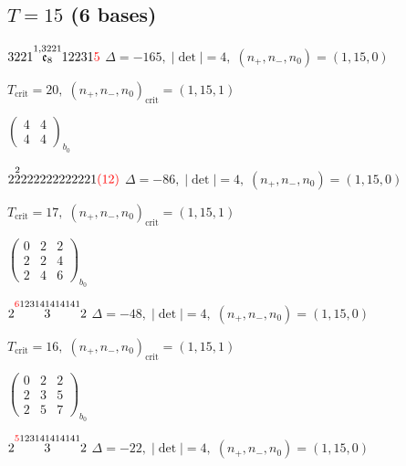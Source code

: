 \documentclass[10pt]{article}
\begin{document}
\subsection*{$T = 15$ \quad (6 bases)}
\smallskip

$3221\overset{1,3221}{\mathfrak{e}_8}12231\textcolor{red}{5}$ \quad $\Delta=-165,\; |\det|=4,\; (n_+,n_-,n_0)=(1,15,0)$

\hspace{1em}$T_{\text{crit}}=20,\; (n_+,n_-,n_0)_{\text{crit}}=(1,15,1)$

\hspace{2em}$\left(\begin{smallmatrix}4 & 4 \\ 4 & 4\end{smallmatrix}\right)_{\!b_0}$

\smallskip

$2\overset{2}{2}222222222221\textcolor{red}{(12)}$ \quad $\Delta=-86,\; |\det|=4,\; (n_+,n_-,n_0)=(1,15,0)$

\hspace{1em}$T_{\text{crit}}=17,\; (n_+,n_-,n_0)_{\text{crit}}=(1,15,1)$

\hspace{2em}$\left(\begin{smallmatrix}0 & 2 & 2 \\ 2 & 2 & 4 \\ 2 & 4 & 6\end{smallmatrix}\right)_{\!b_0}$

\smallskip

$2\overset{\textcolor{red}{6}123141414141}{3}2$ \quad $\Delta=-48,\; |\det|=4,\; (n_+,n_-,n_0)=(1,15,0)$

\hspace{1em}$T_{\text{crit}}=16,\; (n_+,n_-,n_0)_{\text{crit}}=(1,15,1)$

\hspace{2em}$\left(\begin{smallmatrix}0 & 2 & 2 \\ 2 & 3 & 5 \\ 2 & 5 & 7\end{smallmatrix}\right)_{\!b_0}$

$2\overset{\textcolor{red}{5}123141414141}{3}2$ \quad $\Delta=-22,\; |\det|=4,\; (n_+,n_-,n_0)=(1,15,0)$
\end{document}
